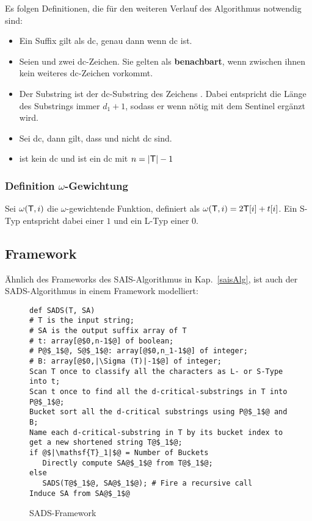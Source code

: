 \bigskip
\noindent Es folgen Definitionen, die für den weiteren Verlauf des Algorithmus notwendig sind:
\begin{itemize}
    \item   Ein Suffix  gilt als dc, genau dann wenn  dc ist.
    \item   Seien  und  zwei dc-Zeichen. Sie gelten als \textbf{benachbart}, wenn zwischen ihnen kein weiteres dc-Zeichen vorkommt.
    \item   Der Substring  ist der dc-Substring des Zeichens . Dabei entspricht die Länge des Substrings immer $d_1+1$, sodass er wenn nötig mit dem Sentinel ergänzt wird.
    \item   Sei  dc, dann gilt, dass  und  nicht dc sind.
    \item   {} ist kein dc und  ist ein dc mit $n=|\inputtext|-1$
\end{itemize}
\subsubsection{Definition $\omega$-Gewichtung}
\label{weighting}
Sei $\omega(\inputtext,i)$ die $\omega$-gewichtende Funktion, definiert als $\omega(\inputtext,i) = 2\inputtext[i]+t[i]$. Ein S-Typ entspricht dabei einer $1$ und ein L-Typ einer $0$.

\subsection{Framework}
Ähnlich des Frameworks des SAIS-Algorithmus in Kap.~\ref{saisAlg}, ist auch der SADS-Algorithmus in einem Framework\cite[Fig.~3]{saca:6} modelliert:
\label{sadsAlg}
\begin{figure}[h]
\begin{verbatim}
def SADS(T, SA)
# T is the input string;
# SA is the output suffix array of T
# t: array[@$0,n-1$@] of boolean;
# P@$_1$@, S@$_1$@: array[@$0,n_1-1$@] of integer;
# B: array[@$0,|\Sigma (T)|-1$@] of integer;
Scan T once to classify all the characters as L- or S-Type into t;
Scan t once to find all the d-critical-substrings in T into P@$_1$@;
Bucket sort all the d-critical substrings using P@$_1$@ and B;
Name each d-critical-substring in T by its bucket index to get a new shortened string T@$_1$@;
if @$|\mathsf{T}_1|$@ = Number of Buckets
   Directly compute SA@$_1$@ from T@$_1$@;
else
   SADS(T@$_1$@, SA@$_1$@); # Fire a recursive call
Induce SA from SA@$_1$@
\end{verbatim}
\caption{SADS-Framework}
\end{figure}


